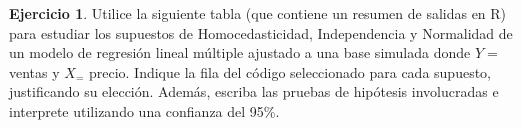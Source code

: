 \documentclass[
  11pt,
]{book}
\theoremstyle{definition}
\theoremstyle{definition}
\theoremstyle{definition}
\newtheorem{exercise}{Ejercicio}[chapter]
\theoremstyle{definition}
\theoremstyle{remark}
\begin{document}
\begin{exercise}

Utilice la siguiente tabla (que contiene un resumen de salidas en R) para estudiar los supuestos de Homocedasticidad, Independencia y Normalidad de un modelo de regresión lineal múltiple ajustado a una base simulada donde \(Y=\) ventas y \(X_=\) precio. Indique la fila del código seleccionado para cada supuesto, justificando su elección. Además, escriba las pruebas de hipótesis involucradas e interprete utilizando una confianza del 95\%.

\begin{table}[H]
\centering
{}
\end{table}

\end{exercise}
\end{document}

